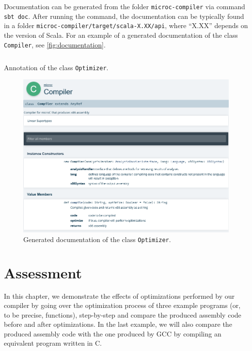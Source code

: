 \documentclass[thesis=M,english]{FITthesis}[2019/12/23]
\begin{document}
Documentation can be generated from the folder \texttt{microc-compiler} via command \texttt{sbt doc}. After running the command, the documentation can be typically found in a folder \texttt{microc-compiler/target/scala-X.XX/api}, where “X.XX” depends on the version of Scala. For an example of a generated documentation of the class \texttt{Compiler}, see \autoref{fig:documentation}.

\begin{listing}
	\inputminted[tabsize=2,breaklines,bgcolor=codebg]{scala}{snippets/annotation.m}
	\caption{Annotation of the class \texttt{Optimizer}.}
	\label{lst:annotation}
\end{listing}

\begin{figure}
    \centering
    \includegraphics[width=12.5cm]{img/documentation.png}
    \caption{Generated documentation of the class \texttt{Optimizer}.}\label{fig:documentation}
\end{figure}



\chapter{Assessment}
In this chapter, we demonstrate the effects of optimizations performed by our compiler by going over the optimization process of three example programs (or, to be precise, functions), step-by-step and compare the produced assembly code before and after optimizations. In the last example, we will also compare the produced assembly code with the one produced by GCC by compiling an equivalent program written in C.
\end{document}
